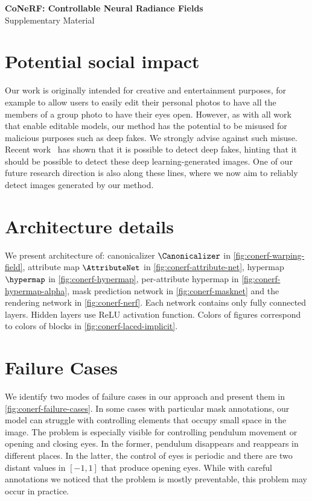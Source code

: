 {
\vspace{2.0em}
\centering
\Large
\textbf{CoNeRF: Controllable Neural Radiance Fields} \\
\vspace{0.5em}
Supplementary Material \\ \vspace{1.0em} }

\section{Potential social impact} Our work is originally intended for creative
  and entertainment purposes, for example to allow users to easily edit their
  personal photos to have all the members of a group photo to have their eyes
  open.
  However, as with all work that enable editable models, our method has the
  potential to be misused for malicious purposes such as deep fakes.
  We strongly advise against such misuse.
  Recent work~\cite{asnani2021reverse} has shown that it is possible to detect
  deep fakes, hinting that it should be possible to detect these deep
  learning-generated images.
  One of our future research direction is also along these lines, where we now
  aim to reliably detect images generated by our method.

\section{Architecture details}
  We present architecture of: canonicalizer $\Canonicalizer$ in
  \cref{fig:conerf-warping-field}, attribute map $\AttributeNet$ in
  \cref{fig:conerf-attribute-net}, hypermap $\hypermap$ in
  \cref{fig:conerf-hypermap}, per-attribute hypermap in
  \cref{fig:conerf-hypermap-alpha}, mask prediction network in
  \cref{fig:conerf-masknet} and the rendering network in \cref{fig:conerf-nerf}.
  Each network contains only fully connected layers.
  Hidden layers use ReLU activation function.
  Colors of figures correspond to colors of blocks in
  \cref{fig:conerf-laced-implicit}.

\section{Failure Cases}
  
  We identify two modes of failure cases in our approach and present them in
  \cref{fig:conerf-failure-cases}.
  In some cases with particular mask annotations, our model can struggle with
  controlling elements that occupy small space in the image.
  The problem is especially visible for controlling pendulum movement or opening
  and closing eyes.
  In the former, pendulum disappears and reappears in different places.
  In the latter, the control of eyes is periodic and there are two distant
  values in $[-1, 1]$ that produce opening eyes.
  While with careful annotations we noticed that the problem is mostly
  preventable, this problem may occur in practice.

